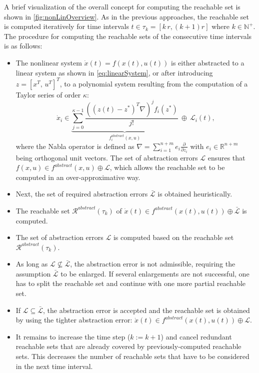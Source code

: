 A brief visualization of the overall concept for computing the reachable set is shown in \cref{fig:nonLinOverview}. As in the previous approaches, the reachable set is computed iteratively for time intervals $t\in \tau_k = [k \, r, (k+1)r]$ where $k \in \mathbb{N}^+$. The procedure for computing the reachable sets of the consecutive time intervals is as follows:

\begin{itemize}

\item[\ding{192}] The nonlinear system $\dot{x}(t)= f(x(t),u(t))$ is either abstracted to a linear system as shown in \eqref{eq:linearSystem}, or after introducing $z= [x^T, \, u^T]^T$, to a polynomial system resulting from the computation of a Taylor series of order $\kappa$:
\begin{equation} \label{eq:polynomialEquation}
 \dot{x}_i \in \underbrace{\sum_{j=0}^{\kappa-1} \frac{\left((z(t)-z^*)^T \nabla \right)^j f_i(z^*)}{j!}}_{f_i^{abstract}(x,u)} ~\oplus ~\mathcal{L}_i(t),
\end{equation}
where the Nabla operator is defined as $\nabla = \sum_{i=1}^{n+m} e_i \frac{\partial}{\partial z_i}$ with $e_i \in \mathbb{R}^{n+m}$ being orthogonal unit vectors. The set of abstraction errors $\mathcal{L}$ ensures that $f(x,u)\in f^{abstract}(x,u) \oplus \mathcal{L}$, which allows the reachable set to be computed in an over-approximative way. 

\item[\ding{193}] Next, the set of required abstraction errors $\bar{\mathcal{L}}$ is obtained heuristically.

\item[\ding{194}] The reachable set $\mathcal{R}^{abstract}(\tau_k)$ of $\dot{x}(t) \in f^{abstract}(x(t),u(t)) \oplus \bar{\mathcal{L}}$ is computed.

\item[\ding{195}] The set of abstraction errors $\mathcal{L}$ is computed based on the reachable set $\mathcal{R}^{abstract}(\tau_k)$. 

\item[\ding{196}] As long as $\mathcal{L} \nsubseteq \bar{\mathcal{L}}$, the abstraction error is not admissible, requiring the assumption $\bar{\mathcal{L}}$ to be enlarged. If several enlargements are not successful, one has to split the reachable set and continue with one more partial reachable set. 

\item[\ding{197}] If $\mathcal{L} \subseteq \bar{\mathcal{L}}$, the abstraction error is accepted and the reachable set is obtained by using the tighter abstraction error: $\dot{x}(t) \in f^{abstract}(x(t),u(t)) \oplus \mathcal{L}$. 

\item[\ding{198}] It remains to increase the time step ($k:=k+1$) and cancel redundant reachable sets that are already covered by previously-computed reachable sets. This decreases the number of reachable sets that have to be considered in the next time interval. 
\end{itemize}

